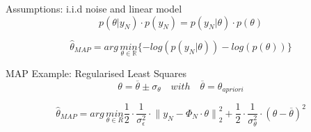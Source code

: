 \begin{tcolorbox}[colback=yellow!5!white,colframe=yellow!75!white,coltitle=black,title=\textbf{Bayesian Estimation and the Maximum a Posteriori Estimate}]
Assumptions: i.i.d noise and linear model
\begin{equation*}
p(\theta |{ y }_{ N })\cdot p({ y }_{ N })=p({ y }_{ N }|\theta )\cdot p(\theta)
\end{equation*}

\begin{equation*}
{ \hat{\theta} }_{ MAP } = arg \, \underset { \theta \in \mathbb{R} }{ min } \{-log(p({ y }_{ N }|\theta))-log(p(\theta))\}
\end{equation*}

MAP Example: Regularised Least Squares
\begin{equation*}
\theta =\overline { \theta  } \pm { \sigma  }_{ \theta  }\quad with \quad \overline { \theta  } = { \theta  }_{ apriori  }
\end{equation*}

\begin{equation*}
{ \hat { \theta  }  }_{ MAP }=arg\, \underset { \theta \in { R } }{ min } \frac { 1 }{ 2 } \cdot \frac { 1 }{ { \sigma  }_{ \epsilon  }^{ 2 } } \cdot { \parallel { y }_{ N }-{ \Phi  }_{ N }\cdot \theta \parallel  }_{ 2 }^{ 2 }+\frac { 1 }{ 2 } \cdot \frac { 1 }{ { \sigma  }_{ \theta  }^{ 2 } } \cdot { (\theta -  \overline{\theta}) }^{ 2 }
\end{equation*}
\end{tcolorbox}


